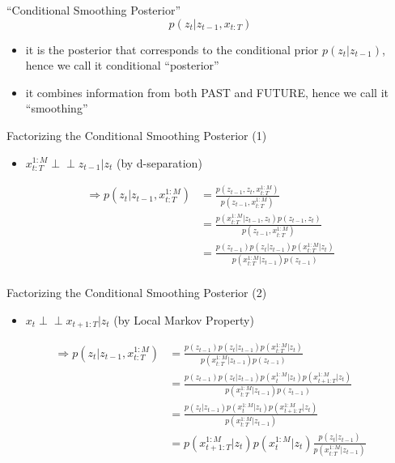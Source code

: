 \documentclass{beamer}
\begin{document}
\begin{frame}{``Conditional Smoothing Posterior''}
\[
p(z_t|z_{t-1},x_{t:T})
\]
\begin{itemize}
\item it is the posterior that corresponds to the
conditional prior $p(z_t|z_{t-1})$, hence we call it conditional ``posterior''
\item it combines information from both
PAST and FUTURE, hence we call it ``smoothing''
\end{itemize}
\end{frame}

\begin{frame}{Factorizing the Conditional Smoothing Posterior (1)}
\begin{itemize}
\item $x_{t:T}^{1:M}\perp\!\!\!\perp z_{t-1}|z_{t}$ (by d-separation)
\end{itemize}
\[
\begin{split}
\Rightarrow p(z_t|z_{t-1},x_{t:T}^{1:M})&=\frac{p(z_{t-1},z_{t},x_{t:T}^{1:M})}{p(z_{t-1},x_{t:T}^{1:M})}\\
&=\frac{p(x_{t:T}^{1:M}|z_{t-1},z_{t})p(z_{t-1},z_{t})}{p(z_{t-1},x_{t:T}^{1:M})}\\
&=\frac{p(z_{t-1})p(z_t|z_{t-1})p(x_{t:T}^{1:M}|z_t)}{p(x_{t:T}^{1:M}|z_{t-1})p(z_{t-1})}\\
\end{split}
\]
\end{frame}

\begin{frame}{Factorizing the Conditional Smoothing Posterior (2)}
\begin{itemize}
\item $x_t\perp\!\!\!\perp x_{t+1:T}|z_t$ (by Local Markov Property)
\end{itemize}
\[
\begin{split}
\Rightarrow p(z_t|z_{t-1},x_{t:T}^{1:M})&=\frac{p(z_{t-1})p(z_t|z_{t-1})p(x_{t:T}^{1:M}|z_t)}{p(x_{t:T}^{1:M}|z_{t-1})p(z_{t-1})}\\
&=\frac{p(z_{t-1})p(z_t|z_{t-1})p(x_t^{1:M}|z_t)p(x_{t+1:T}^{1:M}|z_t)}{p(x_{t:T}^{1:M}|z_{t-1})p(z_{t-1})}\\
&=\frac{p(z_t|z_{t-1})p(x_t^{1:M}|z_t)p(x_{t+1:T}^{1:M}|z_t)}{p(x_{t:T}^{1:M}|z_{t-1})}\\
&=p(x_{t+1:T}^{1:M}|z_t)p(x_t^{1:M}|z_t)\frac{p(z_t|z_{t-1})}{p(x_{t:T}^{1:M}|z_{t-1})}
\end{split}
\]
\end{frame}
\end{document}

